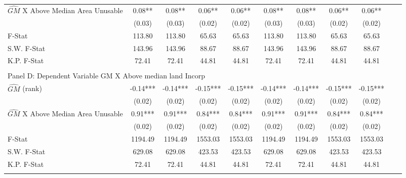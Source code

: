 \begin{table}[htbp]
\begin{threeparttable}
\begin{tabular}{l*{10}{c}}
\addlinespace
$\hat{GM}$ X Above Median Area Unusable&       0.08** &       0.08** &       0.06** &       0.06** &       0.08** &       0.08** &       0.06** &       0.06** \\
                &     (0.03)   &     (0.03)   &     (0.02)   &     (0.02)   &     (0.03)   &     (0.03)   &     (0.02)   &     (0.02)   \\
\midrule
F-Stat          &     113.80   &     113.80   &      65.63   &      65.63   &     113.80   &     113.80   &      65.63   &      65.63   \\
S.W. F-Stat     &     143.96   &     143.96   &      88.67   &      88.67   &     143.96   &     143.96   &      88.67   &      88.67   \\
K.P. F-Stat     &      72.41   &      72.41   &      44.81   &      44.81   &      72.41   &      72.41   &      44.81   &      44.81   \\
\cmidrule[\heavyrulewidth](lr){1-9} \\ \cmidrule[\heavyrulewidth](lr){1-9}
\multicolumn{8}{l}{Panel D: Dependent Variable GM X Above median land Incorp}\\
\cmidrule(lr){1-9}
$\hat{GM}$ (rank)&      -0.14***&      -0.14***&      -0.15***&      -0.15***&      -0.14***&      -0.14***&      -0.15***&      -0.15***\\
                &     (0.02)   &     (0.02)   &     (0.02)   &     (0.02)   &     (0.02)   &     (0.02)   &     (0.02)   &     (0.02)   \\
\addlinespace
$\hat{GM}$ X Above Median Area Unusable&       0.91***&       0.91***&       0.84***&       0.84***&       0.91***&       0.91***&       0.84***&       0.84***\\
                &     (0.02)   &     (0.02)   &     (0.02)   &     (0.02)   &     (0.02)   &     (0.02)   &     (0.02)   &     (0.02)   \\
\midrule
F-Stat          &    1194.49   &    1194.49   &    1553.03   &    1553.03   &    1194.49   &    1194.49   &    1553.03   &    1553.03   \\
S.W. F-Stat     &     629.08   &     629.08   &     423.53   &     423.53   &     629.08   &     629.08   &     423.53   &     423.53   \\
K.P. F-Stat     &      72.41   &      72.41   &      44.81   &      44.81   &      72.41   &      72.41   &      44.81   &      44.81   \\
\cmidrule[\heavyrulewidth](lr){1-9} \\ \cmidrule[\heavyrulewidth](lr){1-9}

\end{tabular}
\end{threeparttable}
\end{table}

